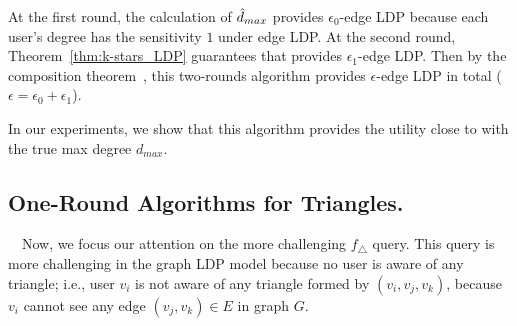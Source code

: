 
At the first round, the calculation of $\hat{d}_{max}$  provides $\epsilon_0$-edge LDP because each user's degree has the sensitivity $1$ under edge LDP. 
At the second round, Theorem~\ref{thm:k-stars_LDP} guarantees that 
 provides $\epsilon_1$-edge LDP. 
Then by the composition theorem~\cite{DP}, this two-rounds algorithm provides $\epsilon$-edge LDP in total ($\epsilon =\epsilon_0 + \epsilon_1$). 

In our experiments, we show that this algorithm provides the utility close to  with the true max degree $d_{max}$. 

\subsection{One-Round Algorithms for Triangles.}
\label{sub:non-interactive_triangles}
~~Now, we focus our attention on the more challenging $f_\triangle$ query. This
query is more challenging in the graph LDP model because no user is aware of any
triangle; i.e., user $v_i$ is not aware of any triangle formed by $(v_i, v_j, v_k)$, because $v_i$ cannot see any edge $(v_j, v_k) \in E$ in graph $G$. 

